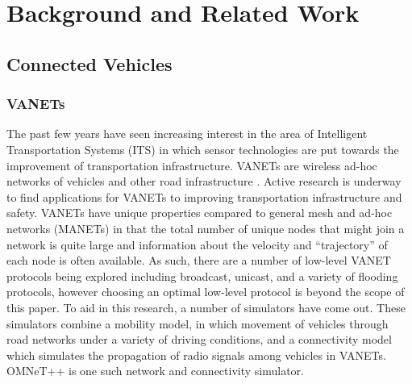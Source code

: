 \documentclass{thesis}
\begin{document}
\chapter{Background and Related Work}
    \label{chap:background}
    \section{Connected Vehicles}
    \subsection{VANETs}
        The past few years have seen increasing interest in the area of Intelligent Transportation
        Systems (ITS) in which sensor technologies are put towards the improvement of
        transportation infrastructure. VANETs are wireless ad-hoc networks of vehicles and other
        road infrastructure \cite{vanet:simulators}. Active research is underway to find applications 
        for VANETs to improving transportation infrastructure and safety. 
        VANETs have unique properties compared to general mesh and ad-hoc networks (MANETs) in that
        the total number of unique nodes that might join a network is quite large and information
        about the velocity and ``trajectory'' of each node is often available.
        As such, there are a number of low-level VANET protocols being explored including broadcast,
        unicast, and a variety of flooding protocols, however choosing an optimal low-level protocol is 
        beyond the scope of this paper.
        To aid in this research, a number of simulators have
        come out. These simulators combine a mobility model, in which movement of vehicles through road
        networks under a variety of driving conditions, and a connectivity model which simulates the
        propagation of radio signals among vehicles in VANETs. OMNeT++ is one such network and connectivity
        simulator.
\end{document}
